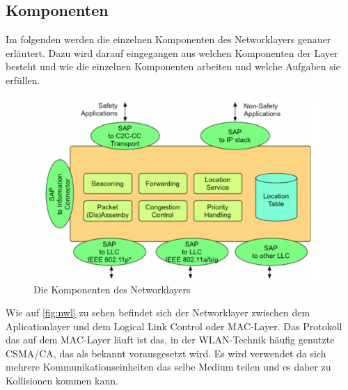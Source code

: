 \subsection{Komponenten}
Im folgenden werden die einzelnen Komponenten des Networklayers genauer erläutert. Dazu wird darauf eingegangen aus welchen Komponenten der Layer besteht und wie die einzelnen Komponenten arbeiten und welche Aufgaben sie erfüllen.
\begin{figure}
\includegraphics[width=0.99\textwidth]{content/images/03_networklayer/networklayer.png}
\caption{Die Komponenten des Networklayers\cite{C2C-manifesto}}
\label{fig:nwl}
\end{figure}
Wie auf \autoref{fig:nwl} zu sehen befindet sich der Networklayer zwischen dem Aplicationlayer und dem Logical Link Control oder MAC-Layer. Das Protokoll das auf dem MAC-Layer läuft ist das, in der WLAN-Technik häufig genutzte CSMA/CA, das als bekannt vorausgesetzt wird. Es wird verwendet da sich mehrere Kommunikationseinheiten das selbe Medium teilen und es daher zu Kollisionen kommen kann. 

